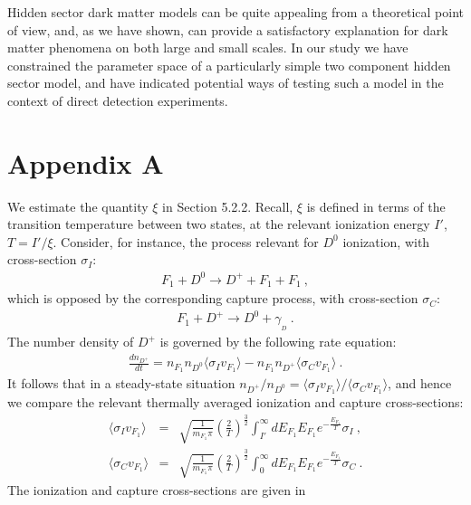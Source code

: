 \documentclass[12pt]{article}
\begin{document}
{{Hidden sector dark matter models can be quite appealing from a
theoretical point of view, and, as we have shown, can provide a
satisfactory explanation for dark matter phenomena on both large and
small scales. In our study we have constrained the parameter space of a
particularly simple two component hidden sector model, and have
indicated potential ways of testing such a model in the context of
direct detection experiments.


\section*{Appendix A}

We estimate the quantity $\xi$ in Section 5.2.2. Recall, $\xi$ is
defined in terms of the transition temperature between two states, at
the relevant ionization energy $I'$, $T = I'/\xi$. Consider, for
instance, the process relevant for $D ^0$ ionization, with cross-section
$\sigma _I$:
%
\begin{eqnarray}
F_1 + D ^0 \rightarrow D ^+ + F_1 + F_1 \ ,
\label{ionziationd}
\end{eqnarray}
%
which is opposed by the corresponding capture process, with
cross-section $\sigma _C$:
%
\begin{eqnarray}
F_1 + D ^+ \rightarrow D ^0 + \gamma _{_D} \ .
\label{captured}
\end{eqnarray}
%
The number density of $D ^+$ is governed by the following rate equation:
%
\begin{eqnarray}
\frac{dn _{D ^+}}{dt} = n _{F_1}n _{D ^0}\langle \sigma _Iv
_{F_1}\rangle - n _{F_1}n _{D ^+}\langle \sigma _Cv _{F_1}\rangle \ .
\label{ratedp}
\end{eqnarray}
%
It follows that in a steady-state situation $n _{D ^+}/n _{D ^0}=\langle
\sigma _Iv _{F_1} \rangle/\langle \sigma _Cv _{F_1} \rangle$, and hence
we compare the relevant thermally averaged ionization and capture
cross-sections:
%
\begin{eqnarray}
\langle \sigma _Iv _{F_1} \rangle &=& \sqrt{\frac{1}{m _{F_1}\pi}}\left
(\frac{2}{T}\right ) ^{\frac{3}{2}}\int _{I'} ^{\infty} dE _{F_1}E
_{F_1}e ^{-\frac{E _{F_1}}{T}}\sigma _I \ , \nonumber \\
\langle \sigma _Cv _{F_1} \rangle &=& \sqrt{\frac{1}{m _{F_1}\pi}}\left
(\frac{2}{T}\right ) ^{\frac{3}{2}}\int _0 ^{\infty} dE _{F_1}E _{F_1}e
^{-\frac{E _{F_1}}{T}}\sigma _C \ .
\label{sigivsigcv}
\end{eqnarray}
%
The ionization and capture cross-sections are given in
}}
\end{document}
